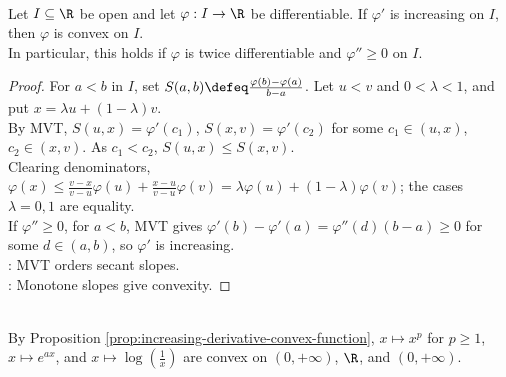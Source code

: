 \begin{proposition} \label{prop:increasing-derivative-convex-function} \\
Let $I\subseteq\R$ be open and let $\varphi:I\to\R$ be differentiable. If $\varphi'$ is increasing on $I$, then $\varphi$ is convex on $I$.\\
In particular, this holds if $\varphi$ is twice differentiable and $\varphi''\geq0$ on $I$.
\begin{proof} For $a<b$ in $I$, set $S(a,b)\defeq\frac{\varphi(b)-\varphi(a)}{b-a}$. Let $u<v$ and $0<\lambda<1$, and put $x=\lambda u+(1-\lambda)v$.\\
By MVT, $S(u,x)=\varphi'(c_1)$, $S(x,v)=\varphi'(c_2)$ for some $c_1\in(u,x)$, $c_2\in(x,v)$. As $c_1<c_2$, $S(u,x)\leq S(x,v)$.\\
Clearing denominators, $\varphi(x)\leq\frac{v-x}{v-u}\varphi(u)+\frac{x-u}{v-u}\varphi(v)=\lambda\varphi(u)+(1-\lambda)\varphi(v)$; the cases $\lambda=0,1$ are equality.\\
If $\varphi''\geq0$, for $a<b$, MVT gives $\varphi'(b)-\varphi'(a)=\varphi''(d)(b-a)\geq0$ for some $d\in(a,b)$, so $\varphi'$ is increasing.\\
: MVT orders secant slopes.\\
: Monotone slopes give convexity.
\end{proof}
\end{proposition}

\begin{example} \label{ex:basic-convex-functions-second-derivative} \\
By Proposition \ref{prop:increasing-derivative-convex-function}, $x\mapsto x^p$ for $p\geq1$, $x\mapsto e^{ax}$, and $x\mapsto\log(\frac{1}{x})$ are convex on $(0,+\infty)$, $\R$, and $(0,+\infty)$.
\end{example}

